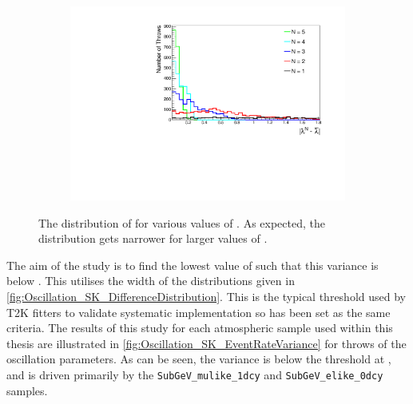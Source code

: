 \begin{figure}[h]                                                                                                                                                                                          
  \begin{subfigure}[t]{\textwidth}
    \includegraphics[width=\textwidth, trim={0mm 0mm 0mm 0mm}, clip,page=1]{Figures/Oscillation/DifferenceInEventRateToMean.pdf}
  \end{subfigure}
  \caption{The distribution of  for various values of . As expected, the distribution gets narrower for larger values of .}
  \label{fig:Oscillation_SK_DifferenceDistribution}
\end{figure}

The aim of the study is to find the lowest value of  such that this variance is below . This utilises the width of the distributions given in \autoref{fig:Oscillation_SK_DifferenceDistribution}. This is the typical threshold used by T2K fitters to validate systematic implementation so has been set as the same criteria. The results of this study for each atmospheric sample used within this thesis are illustrated in \autoref{fig:Oscillation_SK_EventRateVariance} for  throws of the oscillation parameters. As can be seen, the variance is below the threshold at , and is driven primarily by the \texttt{SubGeV\_mulike\_1dcy} and \texttt{SubGeV\_elike\_0dcy} samples.

